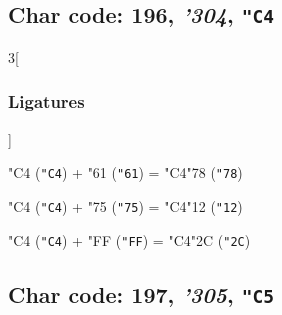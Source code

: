 \documentclass{article}
\newlength{\maxcharwidth}
\begin{document}
\subsection{Char code: 196, {\it'304}, {\tt"C4}}
\label{char_196}


\begin{multicols}{3}[\subsubsection{Ligatures}]

{\testfont\char"C4\noboundary} ({\tt"C4}) + {\testfont\char"61\noboundary} ({\tt"61}) = {\testfont\char"C4\noboundary}{\testfont\char"78\noboundary} ({\tt"78}) 

{\testfont\char"C4\noboundary} ({\tt"C4}) + {\testfont\char"75\noboundary} ({\tt"75}) = {\testfont\char"C4\noboundary}{\testfont\char"12\noboundary} ({\tt"12}) 

{\testfont\char"C4\noboundary} ({\tt"C4}) + {\testfont\char"FF\noboundary} ({\tt"FF}) = {\testfont\char"C4\noboundary}{\testfont\char"2C\noboundary} ({\tt"2C}) 

\end{multicols}

\subsection{Char code: 197, {\it'305}, {\tt"C5}}
\label{char_197}

\end{document}

